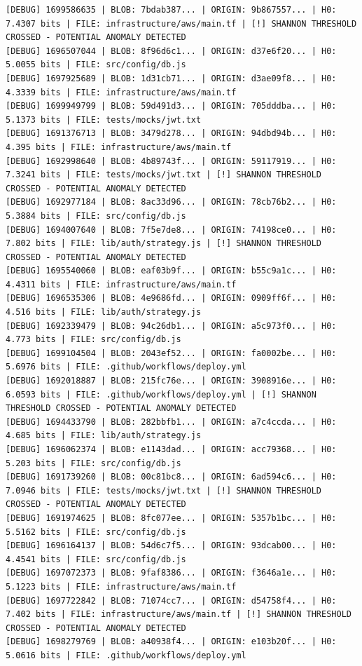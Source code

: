\documentclass[12pt, a4paper, oneside]{report}
\begin{document}
\begin{lstlisting}[basicstyle=\tiny\ttfamily]
[DEBUG] 1699586635 | BLOB: 7bdab387... | ORIGIN: 9b867557... | H0: 7.4307 bits | FILE: infrastructure/aws/main.tf | [!] SHANNON THRESHOLD CROSSED - POTENTIAL ANOMALY DETECTED
[DEBUG] 1696507044 | BLOB: 8f96d6c1... | ORIGIN: d37e6f20... | H0: 5.0055 bits | FILE: src/config/db.js
[DEBUG] 1697925689 | BLOB: 1d31cb71... | ORIGIN: d3ae09f8... | H0: 4.3339 bits | FILE: infrastructure/aws/main.tf
[DEBUG] 1699949799 | BLOB: 59d491d3... | ORIGIN: 705dddba... | H0: 5.1373 bits | FILE: tests/mocks/jwt.txt
[DEBUG] 1691376713 | BLOB: 3479d278... | ORIGIN: 94dbd94b... | H0: 4.395 bits | FILE: infrastructure/aws/main.tf
[DEBUG] 1692998640 | BLOB: 4b89743f... | ORIGIN: 59117919... | H0: 7.3241 bits | FILE: tests/mocks/jwt.txt | [!] SHANNON THRESHOLD CROSSED - POTENTIAL ANOMALY DETECTED
[DEBUG] 1692977184 | BLOB: 8ac33d96... | ORIGIN: 78cb76b2... | H0: 5.3884 bits | FILE: src/config/db.js
[DEBUG] 1694007640 | BLOB: 7f5e7de8... | ORIGIN: 74198ce0... | H0: 7.802 bits | FILE: lib/auth/strategy.js | [!] SHANNON THRESHOLD CROSSED - POTENTIAL ANOMALY DETECTED
[DEBUG] 1695540060 | BLOB: eaf03b9f... | ORIGIN: b55c9a1c... | H0: 4.4311 bits | FILE: infrastructure/aws/main.tf
[DEBUG] 1696535306 | BLOB: 4e9686fd... | ORIGIN: 0909ff6f... | H0: 4.516 bits | FILE: lib/auth/strategy.js
[DEBUG] 1692339479 | BLOB: 94c26db1... | ORIGIN: a5c973f0... | H0: 4.773 bits | FILE: src/config/db.js
[DEBUG] 1699104504 | BLOB: 2043ef52... | ORIGIN: fa0002be... | H0: 5.6976 bits | FILE: .github/workflows/deploy.yml
[DEBUG] 1692018887 | BLOB: 215fc76e... | ORIGIN: 3908916e... | H0: 6.0593 bits | FILE: .github/workflows/deploy.yml | [!] SHANNON THRESHOLD CROSSED - POTENTIAL ANOMALY DETECTED
[DEBUG] 1694433790 | BLOB: 282bbfb1... | ORIGIN: a7c4ccda... | H0: 4.685 bits | FILE: lib/auth/strategy.js
[DEBUG] 1696062374 | BLOB: e1143dad... | ORIGIN: acc79368... | H0: 5.203 bits | FILE: src/config/db.js
[DEBUG] 1691739260 | BLOB: 00c81bc8... | ORIGIN: 6ad594c6... | H0: 7.0946 bits | FILE: tests/mocks/jwt.txt | [!] SHANNON THRESHOLD CROSSED - POTENTIAL ANOMALY DETECTED
[DEBUG] 1691974625 | BLOB: 8fc077ee... | ORIGIN: 5357b1bc... | H0: 5.5162 bits | FILE: src/config/db.js
[DEBUG] 1696164137 | BLOB: 54d6c7f5... | ORIGIN: 93dcab00... | H0: 4.4541 bits | FILE: src/config/db.js
[DEBUG] 1697072373 | BLOB: 9faf8386... | ORIGIN: f3646a1e... | H0: 5.1223 bits | FILE: infrastructure/aws/main.tf
[DEBUG] 1697722842 | BLOB: 71074cc7... | ORIGIN: d54758f4... | H0: 7.402 bits | FILE: infrastructure/aws/main.tf | [!] SHANNON THRESHOLD CROSSED - POTENTIAL ANOMALY DETECTED
[DEBUG] 1698279769 | BLOB: a40938f4... | ORIGIN: e103b20f... | H0: 5.0616 bits | FILE: .github/workflows/deploy.yml

\end{lstlisting}
\end{document}
